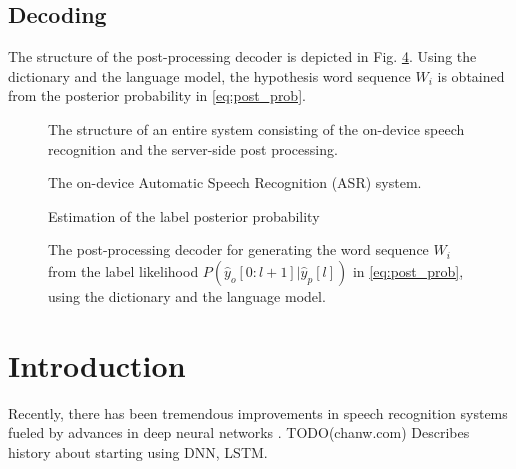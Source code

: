 \documentclass{article}
\begin{document}
\subsection{Decoding}
\label{sec:decoding}
The structure of the post-processing decoder is depicted in Fig.
\ref{fig:post_processing_decoder}. Using the dictionary and the
language model, the hypothesis word sequence $W_i$ is obtained
from the posterior probability in \eqref{eq:post_prob}.




\begin{figure}
  \centering
    \centering
    \resizebox{130mm}{!}{
      
    }
    \caption {
      The structure of an entire system consisting of the on-device speech 
      recognition and the server-side post processing. 
      \label{fig:entire_system}
    }
\end{figure}


\begin{figure}
  \centering
    \centering
    \resizebox{55mm}{!}{
      
    }
    \caption {
      The on-device Automatic Speech Recognition (ASR) system.
      \label{fig:asr_system}
    }
\end{figure}


\begin{figure}
    \centering
    \resizebox{30mm}{!}{
      
    } 
    \caption {
      Estimation of the label posterior probability
      \label{fig:label_posterior_prob_estimation}
    }
\end{figure}


\begin{figure}
    \centering
    \resizebox{70mm}{!}{
      
    } 
    \caption {
      The post-processing decoder for generating the word sequence $W_i$
      from the label likelihood $P(\hat{y}_o[0:l+1] | \hat{y}_p[l])$ in \eqref{eq:post_prob}, 
      using the dictionary and the language model.
      \label{fig:post_processing_decoder}
    }
\end{figure}


\section{Introduction}
Recently, there has been tremendous improvements in speech recognition
systems fueled by advances in deep neural networks
\cite{
  Yu2013FeatureLearningDNN, 
  g_hinton_ieee_signal_processing_mag_2012,
  Seltzer2013DNNAurora4, 
  t_sainath_taslp_2017_00,
  t_sainath_book_chapter_2017_00,
  v_vanhoucke_nips_workshop_2011_00}.
TODO(chanw.com) Describes history about starting using DNN, LSTM.
\end{document}
